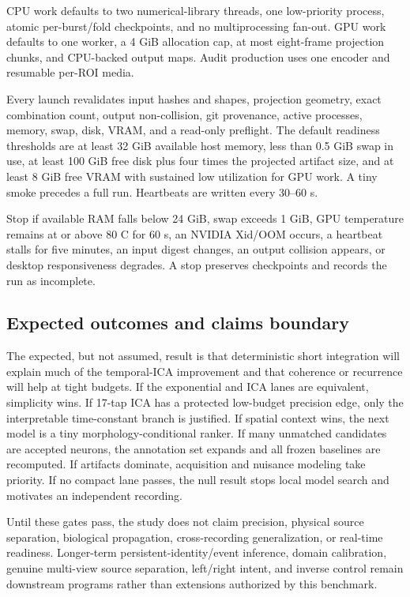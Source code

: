 CPU work defaults to two numerical-library threads, one low-priority process,
atomic per-burst/fold checkpoints, and no multiprocessing fan-out. GPU work
defaults to one worker, a 4 GiB allocation cap, at most eight-frame projection
chunks, and CPU-backed output maps. Audit production uses one encoder and
resumable per-ROI media.

Every launch revalidates input hashes and shapes, projection geometry, exact
combination count, output non-collision, git provenance, active processes,
memory, swap, disk, VRAM, and a read-only preflight. The default readiness
thresholds are at least 32 GiB available host memory, less than 0.5 GiB swap in
use, at least 100 GiB free disk plus four times the projected artifact size,
and at least 8 GiB free VRAM with sustained low utilization for GPU work. A
tiny smoke precedes a full run. Heartbeats are written every 30--60 s.

Stop if available RAM falls below 24 GiB, swap exceeds 1 GiB, GPU temperature
remains at or above 80 C for 60 s, an NVIDIA Xid/OOM occurs, a heartbeat stalls
for five minutes, an input digest changes, an output collision appears, or
desktop responsiveness degrades. A stop preserves checkpoints and records the
run as incomplete.

\subsection{Expected outcomes and claims boundary}

The expected, but not assumed, result is that deterministic short integration
will explain much of the temporal-ICA improvement and that coherence or
recurrence will help at tight budgets. If the exponential and ICA lanes are
equivalent, simplicity wins. If 17-tap ICA has a protected low-budget precision
edge, only the interpretable time-constant branch is justified. If spatial
context wins, the next model is a tiny morphology-conditional ranker. If many
unmatched candidates are accepted neurons, the annotation set expands and all
frozen baselines are recomputed. If artifacts dominate, acquisition and
nuisance modeling take priority. If no compact lane passes, the null result
stops local model search and motivates an independent recording.

Until these gates pass, the study does not claim precision, physical source
separation, biological propagation, cross-recording generalization, or
real-time readiness. Longer-term persistent-identity/event inference, domain
calibration, genuine multi-view source separation, left/right intent, and
inverse control remain downstream programs rather than extensions authorized by
this benchmark.
